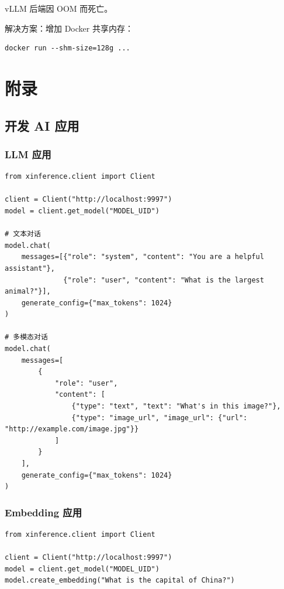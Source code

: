 \documentclass[12pt,UTF8]{ctexbook}
\begin{document}
vLLM 后端因 OOM 而死亡。

解决方案：增加 Docker 共享内存：

\begin{lstlisting}
docker run --shm-size=128g ...
\end{lstlisting}

\part{附录}

\chapter{开发 AI 应用}
\label{chap:develop_apps}

\section{LLM 应用}
\label{sec:llm_apps}

\begin{lstlisting}
from xinference.client import Client

client = Client("http://localhost:9997")
model = client.get_model("MODEL_UID")

# 文本对话
model.chat(
    messages=[{"role": "system", "content": "You are a helpful assistant"}, 
              {"role": "user", "content": "What is the largest animal?"}],
    generate_config={"max_tokens": 1024}
)

# 多模态对话
model.chat(
    messages=[
        {
            "role": "user",
            "content": [
                {"type": "text", "text": "What's in this image?"},
                {"type": "image_url", "image_url": {"url": "http://example.com/image.jpg"}}
            ]
        }
    ],
    generate_config={"max_tokens": 1024}
)
\end{lstlisting}

\section{Embedding 应用}
\label{sec:embedding_apps}

\begin{lstlisting}
from xinference.client import Client

client = Client("http://localhost:9997")
model = client.get_model("MODEL_UID")
model.create_embedding("What is the capital of China?")
\end{lstlisting}
\end{document}
